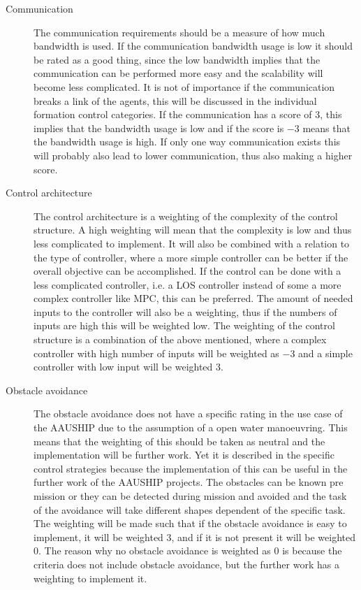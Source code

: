 \begin{description}
\item[Communication] The communication requirements should be a measure of how much bandwidth is used. If the communication bandwidth usage is low it should be rated as a good thing, since the low bandwidth implies that the communication can be performed more easy and the scalability will become less complicated. It is not of importance if the communication breaks a link of the agents, this will be discussed in the individual formation control categories. If the communication has a score of $3$, this implies that the bandwidth usage is low and if the score is $-3$ means that the bandwidth usage is high. If only one way communication exists this will probably also lead to lower communication, thus also making a higher score.

\item[Control architecture] The control architecture is a weighting of the complexity of the control structure. A high weighting will mean that the complexity is low and thus less complicated to implement. It will also be combined with a relation to the type of controller, where a more simple controller can be better if the overall objective can be accomplished. If the control can be done with a less complicated controller, i.e. a \ac{LOS} controller instead of some a more complex controller like \ac{MPC}, this can be preferred. The amount of needed inputs to the controller will also be a weighting, thus if the numbers of inputs are high this will be weighted low. The weighting of the control structure is a combination of the above mentioned, where a complex controller with high number of inputs will be weighted as $-3$ and a simple controller with low input will be weighted $3$.

\item[Obstacle avoidance] The obstacle avoidance does not have a specific rating in the use case of the AAUSHIP due to the assumption of a open water manoeuvring. This means that the weighting of this should be taken as neutral and the implementation will be further work. Yet it is described in the specific control strategies because the implementation of this can be useful in the further work of the AAUSHIP projects. The obstacles can be known pre mission or they can be detected during mission and avoided and the task of the avoidance will take different shapes dependent of the specific task. The weighting will be made such that if the obstacle avoidance is easy to implement, it will be weighted $3$, and if it is not present it will be weighted $0$. The reason why no obstacle avoidance is weighted as $0$ is because the criteria does not include obstacle avoidance, but the further work has a weighting to implement it.


\end{description}
